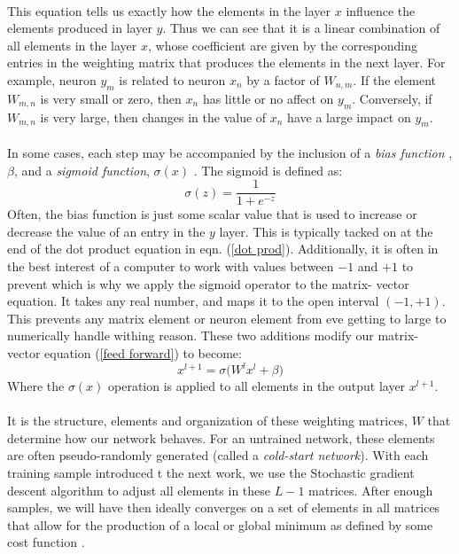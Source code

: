 \documentclass[12pt,letterpaper]{article}
\begin{document}
\paragraph*{}This equation tells us exactly how the elements in the layer $x$ influence the elements produced in layer $y$. Thus we can see that it is a linear combination of all elements in the layer $x$, whose coefficient are given by the corresponding entries in the weighting matrix that produces the elements in the next layer. For example, neuron $y_m$ is related to neuron $x_n$ by a factor of $W_{n,m}$. If the element $W_{m,n}$ is very small or zero, then $x_n$ has little or no affect on $y_m$. Conversely, if $W_{m,n}$ is very large, then changes in the value of $x_n$ have a large impact on $y_m$.
\paragraph*{}In some cases, each step may be accompanied by the inclusion of a \textit{bias function} , $\beta$, and a \textit{sigmoid function}, $\sigma(x)$ \cite{Geron}. The sigmoid is defined as:
\begin{equation}
\label{sigmoid}
\sigma(z) = \frac{1}{1+e^{-z}}
\end{equation}
Often, the bias function is just some scalar value that is used to increase or decrease the value of an entry in the $y$ layer. This is typically tacked on at the end of the dot product equation in eqn. (\ref{dot prod}). Additionally, it is often in the best interest of a computer to work with values between $-1$ and $+1$ to prevent which is why we apply the sigmoid operator to the matrix- vector equation. It takes any real number, and maps it to the open interval $(-1,+1)$. This prevents any matrix element or neuron element from eve getting to large to numerically handle withing reason. These two additions modify our matrix- vector equation (\ref{feed forward}) to become:
\begin{equation}
\label{mod feed forward}
x^{l+1} = \sigma \big( W^l x^l + \beta \big)
\end{equation}
Where the $\sigma(x)$ operation is applied to all elements in the output layer $x^{l+1}$.
\paragraph*{}It is the structure, elements and organization of these weighting matrices, $W$ that determine how our network behaves. For an untrained network, these elements are often pseudo-randomly generated (called a \textit{cold-start network}\cite{Geron}). With each training sample introduced t the next work, we use the Stochastic gradient descent algorithm to adjust all elements in these $L-1$ matrices. After enough samples, we will have then ideally converges on a set of elements in all matrices that allow for the production of a local or global minimum as defined by some cost function \cite{Goodfellow}. 
\end{document}
